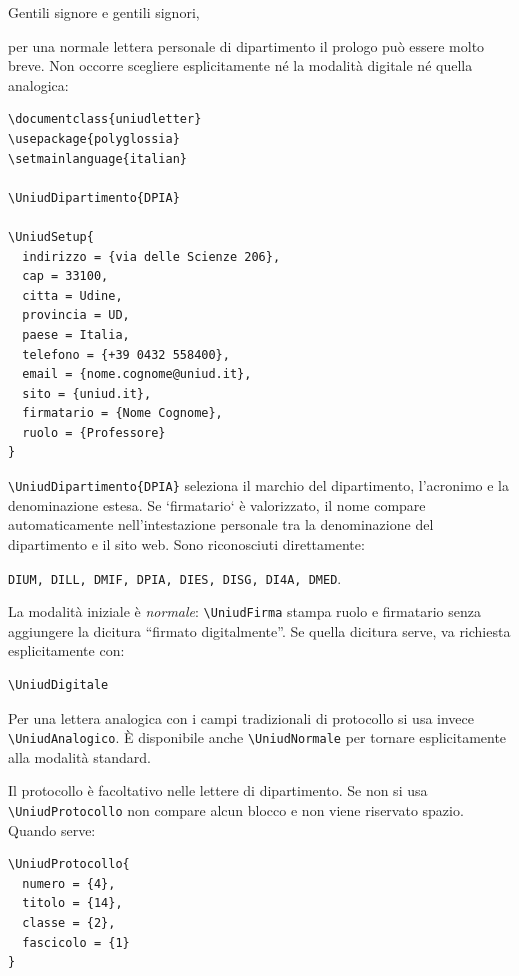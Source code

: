 \documentclass{uniudletter}
\begin{document}
\begin{letter}{}
\opening{Gentili signore e gentili signori,}

per una normale lettera personale di dipartimento il prologo può essere molto
breve. Non occorre scegliere esplicitamente né la modalità digitale né quella
analogica:

\begin{lstlisting}
\documentclass{uniudletter}
\usepackage{polyglossia}
\setmainlanguage{italian}

\UniudDipartimento{DPIA}

\UniudSetup{
  indirizzo = {via delle Scienze 206},
  cap = 33100,
  citta = Udine,
  provincia = UD,
  paese = Italia,
  telefono = {+39 0432 558400},
  email = {nome.cognome@uniud.it},
  sito = {uniud.it},
  firmatario = {Nome Cognome},
  ruolo = {Professore}
}
\end{lstlisting}

\lstinline|\UniudDipartimento{DPIA}| seleziona il marchio del dipartimento,
l'acronimo e la denominazione estesa. Se `firmatario` è valorizzato, il nome
compare automaticamente nell'intestazione personale tra la denominazione del
dipartimento e il sito web. Sono riconosciuti direttamente:

\begin{center}
\texttt{DIUM, DILL, DMIF, DPIA, DIES, DISG, DI4A, DMED}.
\end{center}

La modalità iniziale è \emph{normale}: \lstinline|\UniudFirma| stampa ruolo e
firmatario senza aggiungere la dicitura ``firmato digitalmente''. Se quella
dicitura serve, va richiesta esplicitamente con:

\begin{lstlisting}
\UniudDigitale
\end{lstlisting}

Per una lettera analogica con i campi tradizionali di protocollo si usa invece
\lstinline|\UniudAnalogico|. È disponibile anche
\lstinline|\UniudNormale| per tornare esplicitamente alla modalità standard.

Il protocollo è facoltativo nelle lettere di dipartimento. Se non si usa
\lstinline|\UniudProtocollo| non compare alcun blocco e non viene riservato
spazio. Quando serve:

\begin{lstlisting}
\UniudProtocollo{
  numero = {4},
  titolo = {14},
  classe = {2},
  fascicolo = {1}
}
\end{lstlisting}


\end{letter}
\end{document}
